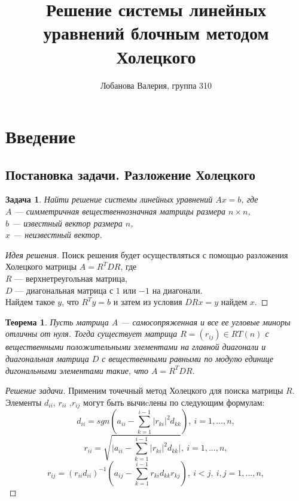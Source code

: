 \documentclass[a4paper,12pt]{article}
\title{\textbf{Решение системы линейных уравнений блочным методом Холецкого}}
\author{Лобанова Валерия, группа 310}
\date{ }
\newtheorem*{task*}{Задача}
\newtheorem*{theorem*}{Теорема}
\begin{document}
\maketitle
\thispagestyle{empty} 
\newpage
\tableofcontents{}

\newpage
\pagestyle{plain}
\section{Введение}
\subsection{Постановка задачи. Разложение Холецкого}
    \begin{task*}
        Найти решение системы линейных уравнений $A x=b$, где \\
        $A $ --- симметричная вещественнозначная матрицы размера $n \times n$, \\
        $b$ --- известный вектор размера $n$, \\
        $x$ --- неизвестный вектор.
    \end{task*}
    
    \begin{proof} [Идея решения]
        Поиск решения будет осуществляться с помощью разложения Холецкого матрицы $A=R^T DR$,  где \\
        $R$ --- верхнетреугольная матрица, \\
        $D$ --- диагональная матрица с $1$ или $-1$  на диагонали.\\
        Найдем такое $y$, что $R^Ty=b$ и затем из условия $DRx=y$ найдем $x$.
    \end{proof}
    
    \begin{theorem*}
        Пусть матрица $A$ --- самосопряженная и все ее угловые миноры отличны
        от нуля. Тогда существует матрица $R=(r_{ij}) \in RT(n)$  с вещественными 
        положительными элементами на главной диагонали и диагональная матрица
        $D$ с вещественными равными по модулю единице дигональными элементами
        такие, что $A=R^T DR$.
    \end{theorem*}
    
    \begin{proof} [Решение задачи]
        Применим точечный метод Холецкого для поиска матрицы $R$.
        Элементы $d_{ii}$, $r_{ii}$ ,$r_{ij}$ могут быть вычиcлены по 
        следующим формулам:
        \begin{equation} \label{dot}
             d_{ii} = sgn(a_{ii}-\sum_{k=1}^{i-1}|r_{ki}|^2d_{kk}),\  i=1,...,n,
        \end{equation}
        $$ 
            r_{ii} = \sqrt{\Big|a_{ii}-\sum_{k=1}^{i-1}|r_{ki}|^2d_{kk}\Big|},\  i=1,...,n, 
        $$
        $$ 
            r_{ij} = (r_{ii}d_{ii})^{-1}
                    (a_{ij}-\sum_{k=1}^{i-1}r_{ki}d_{kk}r_{kj}),\  
                    i<j, \ i,j=1,...,n,
        $$
    \end{proof}
\end{document}
